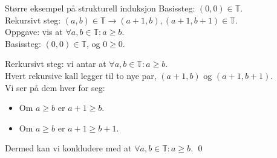 \begin{frame}{Større eksempel på strukturell induksjon}
    Basissteg: $(0, 0) \in \mathbb{T}$.\\
    Rekursivt steg: $(a, b) \in \mathbb{T} \rightarrow (a+1, b), (a+1, b+1) \in \mathbb{T}$.\\
    
    Oppgave: vis at $\forall a, b \in \mathbb{T} : a \geq b$.\\
    
    \pause
    Basissteg: $(0, 0) \in \mathbb{T}$, og $0 \geq 0$. \checkmark\\
    \pause

    Rerkursivt steg: vi antar at $\forall a, b \in \mathbb{T} : a \geq b$.\\
    \pause
    Hvert rekursive kall legger til to nye par, $(a+1, b)$ og $(a+1, b+1)$.\\
    \pause
    Vi ser på dem hver for seg:
    \begin{itemize}
        \item Om $a \geq b$ er $a+1 \geq b$.
        \item Om $a \geq b$ er $a+1 \geq b+1$. \checkmark
    \end{itemize}
    \pause
    Dermed kan vi konkludere med at $\forall a, b \in \mathbb{T} : a \geq b$. \qed
\end{frame}





